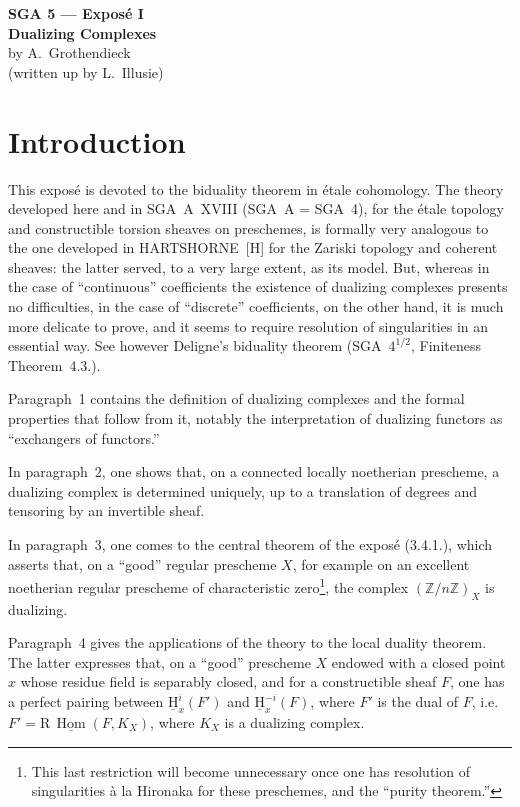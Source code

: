 \documentclass[11pt]{article}
\renewcommand{\H}{\mathrm{H}}
\DeclareMathOperator{\Hom}{Hom}
\newcommand{\R}{\mathrm{R}}
\newcommand{\Z}{\mathbb{Z}}
\providecommand{\Hom}{\operatorname{Hom}}
\providecommand{\R}{\mathrm R}
\providecommand{\Z}{\mathbb Z}
\providecommand{\Hom}{\operatorname{Hom}}
\begin{document}
\begin{center}
{\Large \textbf{SGA 5 --- Exposé I}}\\[0.4em]
{\large \textbf{Dualizing Complexes}}\\[0.3em]
by A.~Grothendieck\\
(written up by L.~Illusie)
\end{center}

\section*{Introduction}

This exposé is devoted to the biduality theorem in étale cohomology. The theory developed here and in SGA~A~XVIII (SGA~A = SGA~4), for the étale topology and constructible torsion sheaves on preschemes, is formally very analogous to the one developed in HARTSHORNE~[H] for the Zariski topology and coherent sheaves: the latter served, to a very large extent, as its model. But, whereas in the case of ``continuous'' coefficients the existence of dualizing complexes presents no difficulties, in the case of ``discrete'' coefficients, on the other hand, it is much more delicate to prove, and it seems to require resolution of singularities in an essential way. See however Deligne's biduality theorem (SGA~$4^{1/2}$, Finiteness Theorem~4.3.).

Paragraph~1 contains the definition of dualizing complexes and the formal properties that follow from it, notably the interpretation of dualizing functors as ``exchangers of functors.''

In paragraph~2, one shows that, on a connected locally noetherian prescheme, a dualizing complex is determined uniquely, up to a translation of degrees and tensoring by an invertible sheaf.

In paragraph~3, one comes to the central theorem of the exposé (3.4.1.), which asserts that, on a ``good'' regular prescheme $X$, for example on an excellent noetherian regular prescheme of characteristic zero\footnote{This last restriction will become unnecessary once one has resolution of singularities à la Hironaka for these preschemes, and the ``purity theorem.''}, the complex $(\Z/n\Z)_X$ is dualizing.

Paragraph~4 gives the applications of the theory to the local duality theorem. The latter expresses that, on a ``good'' prescheme $X$ endowed with a closed point $x$ whose residue field is separably closed, and for a constructible sheaf $F$, one has a perfect pairing between $\underline{\H}^i_x(F')$ and $\underline{\H}^{-i}_x(F)$, where $F'$ is the dual of $F$, i.e.\ $F' = \R\,\underline{\Hom}(F,K_X)$, where $K_X$ is a dualizing complex.
\end{document}
